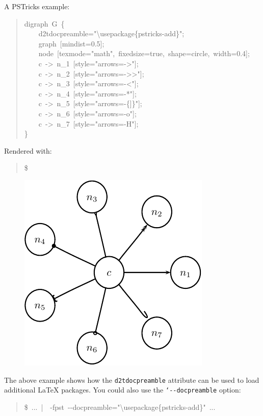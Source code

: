 \documentclass[10pt,a4paper,english]{article}
\begin{document}
A PSTricks example:
\begin{quote}{\ttfamily \raggedright \noindent
digraph~G~{\{}~\\
~~~~d2tdocpreamble="{\textbackslash}usepackage{\{}pstricks-add{\}}";~\\
~~~~graph~{[}mindist=0.5{]};~\\
~~~~node~{[}texmode="math",~fixedsize=true,~shape=circle,~width=0.4{]};~\\
~~~~c~->~n{\_}1~{[}style="arrows=->"{]};~\\
~~~~c~->~n{\_}2~{[}style="arrows=->{}>"{]};~\\
~~~~c~->~n{\_}3~{[}style="arrows=-<"{]};~\\
~~~~c~->~n{\_}4~{[}style="arrows=-*"{]};~\\
~~~~c~->~n{\_}5~{[}style="arrows=-{\{}{]}{\}}"{]};~\\
~~~~c~->~n{\_}6~{[}style="arrows=-o"{]};~\\
~~~~c~->~n{\_}7~{[}style="arrows=-H"{]};~\\
{\}}
}\end{quote}

Rendered with:
\begin{quote}{\ttfamily \raggedright \noindent
{\$}~
}\end{quote}
\begin{figure}[H]
\centering

\includegraphics{pdf/pstarrows}
\end{figure}

The above example shows how the \texttt{d2tdocpreamble} attribute can be used to load additional LaTeX packages. You could also use the \texttt{`-{}-docpreamble} option:
\begin{quote}{\ttfamily \raggedright \noindent
{\$}~...~|~~-fpst~-{}-docpreamble="{\textbackslash}usepackage{\{}pstricks-add{\}}"~...
}\end{quote}
\end{document}
